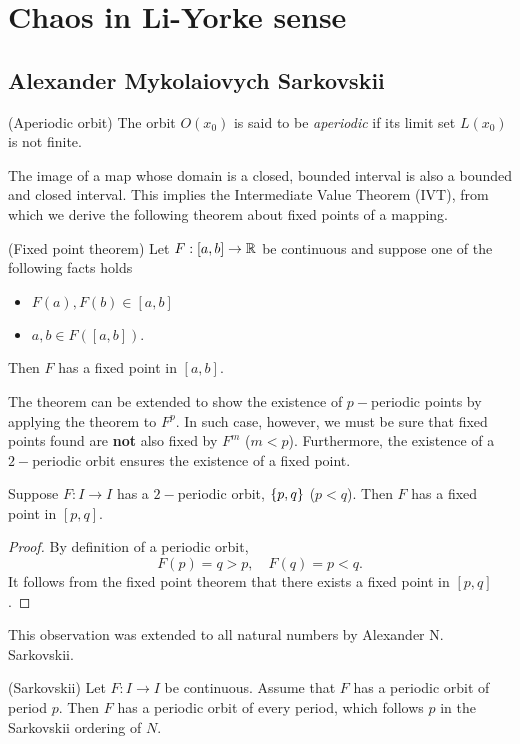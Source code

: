\documentclass[11pt]{book}
\begin{document}
\chapter{Chaos in Li-Yorke sense}

\section{Alexander Mykolaiovych Sarkovskii}
\begin{definition}
  (Aperiodic orbit)
  The orbit $O(x_0)$ is said to be \textit{aperiodic} if its limit set $L(x_0)$ is not finite.
\end{definition}

The image of a map whose domain is a closed, bounded interval is also a bounded and closed interval.
This implies the Intermediate Value Theorem (IVT), from which we derive the following theorem about
fixed points of a mapping.
\begin{proposition}
  (Fixed point theorem)
  Let $F: [a,b] \to \mathbb{R}$ be continuous and suppose one of the following facts holds
  \begin{itemize}
    \item $F(a), F(b)\in [a,b]$
    \item $a, b\in F([a,b])$.
  \end{itemize}
  Then $F$ has a fixed point in $[a,b]$.
\end{proposition}

The theorem can be extended to show the existence of $p-$periodic points by applying the theorem to
$F^p$. In such case, however, we must be sure that fixed points found are \textbf{not} also fixed by
$F^m$ ($m < p$).
Furthermore, the existence of a $2-$periodic orbit ensures the existence of a fixed point.
\begin{proposition}
  Suppose $F: I\to I$ has a $2-$periodic orbit, $\left \{ p,q \right \}$ ($p<q$). Then $F$ has a fixed point in $[p,q]$.
\end{proposition}
\begin{proof}
  By definition of a periodic orbit, 
  \begin{equation*}
    F(p) = q > p, \quad F(q) = p < q.
  \end{equation*}
  It follows from the fixed point theorem that there exists a fixed point in $[p,q]$.
\end{proof}

This observation was extended to all natural numbers by Alexander N. Sarkovskii.
\begin{proposition}
  (Sarkovskii)
  Let $F: I\to I$ be continuous. Assume that $F$ has a periodic orbit of period $p$.
  Then $F$ has a periodic orbit of every period, which follows $p$ in the Sarkovskii
  ordering of $N$.
\end{proposition}
\end{document}
